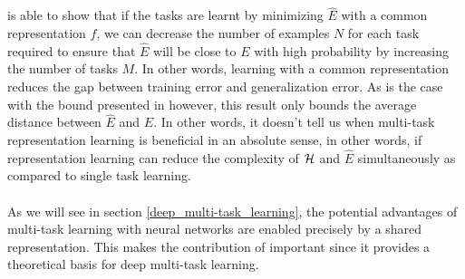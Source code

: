 \\\\
\citet{baxter1995} is able to show that if the tasks are learnt by minimizing $\hat{E}$ with a common representation $f$, we can decrease the number of examples $N$ for each task required to ensure that $\hat{E}$ will be close to $E$ with high probability by increasing the number of tasks $M$. In other words, learning with a common representation reduces the gap between training error and generalization error.
As is the case with the bound presented in \citet{baxter1995} however, this result only bounds the average distance between $\hat{E}$ and $E$. In other words, it doesn't tell us when multi-task representation learning is beneficial in an absolute sense, in other words, if representation learning can reduce the complexity of $\mathcal{H}$ and $\hat{E}$ simultaneously as compared to single task learning.
\\\\
As we will see in section \ref{deep_multi-task_learning}, the potential advantages of multi-task learning with neural networks are enabled precisely by a shared representation. This makes the contribution of \citet{baxter1995} important since it provides a theoretical basis for deep multi-task learning.